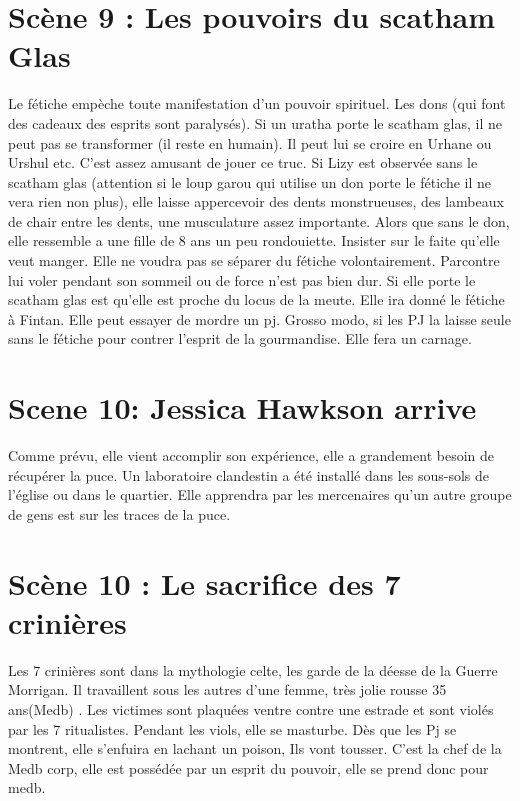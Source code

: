 \documentclass[oneside,12pt]{book}
\begin{document}
\begin{flushleft}
\section{Scène 9 : Les pouvoirs du scatham Glas}
Le fétiche empèche toute manifestation d'un pouvoir spirituel. Les dons (qui font des cadeaux des esprits sont paralysés).
Si un uratha porte le scatham glas, il ne peut pas se transformer (il reste en humain). Il peut lui se croire en Urhane ou Urshul etc. C'est assez amusant de jouer ce truc. 
Si Lizy  est observée sans le scatham glas (attention si le loup garou qui utilise un don porte le fétiche il ne vera rien non plus), elle laisse appercevoir des dents monstrueuses, des lambeaux de chair entre les dents, une musculature assez importante. Alors que sans le don, elle ressemble a une fille de 8 ans un peu rondouiette.   
Insister sur le faite qu'elle veut manger. Elle ne voudra pas se séparer du fétiche volontairement. Parcontre lui voler pendant son sommeil ou de force n'est pas bien dur. Si elle porte le scatham glas est qu'elle est proche du locus de la meute. Elle ira donné le fétiche à Fintan.
Elle peut essayer de mordre un pj. Grosso modo, si les PJ la laisse seule sans le fétiche pour contrer l'esprit de la gourmandise. Elle fera un carnage.


\section{Scene 10: Jessica Hawkson arrive}
Comme prévu, elle vient accomplir son expérience, elle a grandement besoin de récupérer la puce. Un laboratoire clandestin a été installé dans les sous-sols de l'église ou dans le quartier. Elle apprendra par les mercenaires qu'un autre groupe de gens est sur les traces de la puce. 


\section{Scène 10 : Le sacrifice des 7 crinières}
Les 7 crinières sont dans la mythologie celte, les garde de la déesse de la Guerre Morrigan.
Il travaillent sous les autres d'une femme, très jolie rousse 35 ans(Medb) . Les victimes sont plaquées ventre contre une estrade et sont violés par les 7 ritualistes. 
Pendant les viols, elle se masturbe. Dès que les Pj se montrent, elle s'enfuira en lachant un poison, Ils vont tousser. C'est la chef de la Medb corp, elle est possédée par un esprit du pouvoir, elle se prend donc pour medb. 
 

\end{flushleft}
\end{document}
